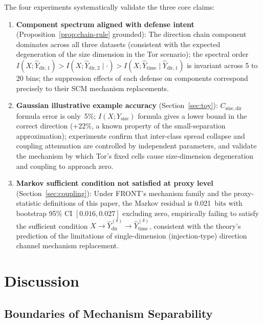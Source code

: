 \documentclass[lettersize,journal]{IEEEtran}
\begin{document}
The four experiments systematically validate the three core claims:
\begin{enumerate}[label=(\arabic*)]
\item \textbf{Component spectrum aligned with defense intent}
  (Proposition~\ref{prop:chain-rule} grounded): The direction chain
  component dominates across all three datasets (consistent with the
  expected degeneration of the size dimension in the Tor scenario);
  the spectral order
  $I(X;\hat{Y}_{\mathrm{dir},1}) > I(X;\hat{Y}_{\mathrm{dir},2}\mid\cdot) > I(X;\hat{Y}_{\mathrm{time}}\mid\hat{Y}_{\mathrm{dir},1})$
  is invariant across 5 to 20 bins; the suppression effects of each defense
  on components correspond precisely to their SCM mechanism replacements.

\item \textbf{Gaussian illustrative example accuracy} (Section~\ref{sec:toy}):
  $C_{\mathrm{size,dir}}$ formula error is only~5\%;
  $I(X;Y_{\mathrm{size}})$ formula gives a lower bound in the correct
  direction ($+22\%$, a known property of the small-separation
  approximation); experiments confirm that inter-class spread collapse and
  coupling attenuation are controlled by independent parameters, and
  validate the mechanism by which Tor's fixed cells cause size-dimension
  degeneration and coupling to approach zero.

\item \textbf{Markov sufficient condition not satisfied at proxy level}
  (Section~\ref{sec:coupling}): Under FRONT's mechanism family and the
  proxy-statistic definitions of this paper, the Markov residual is
  0.021~bits with bootstrap 95\% CI $[0.016,0.027]$ excluding zero,
  empirically failing to satisfy the sufficient condition
  $X\to \hat{Y}^{(\delta)}_{\mathrm{dir}}\to \hat{Y}^{(\delta)}_{\mathrm{time}}$,
  consistent with the theory's prediction of the limitations of
  single-dimension (injection-type) direction channel mechanism replacement.
\end{enumerate}

\section{Discussion}\label{sec:discussion}

\subsection{Boundaries of Mechanism Separability}
\end{document}
